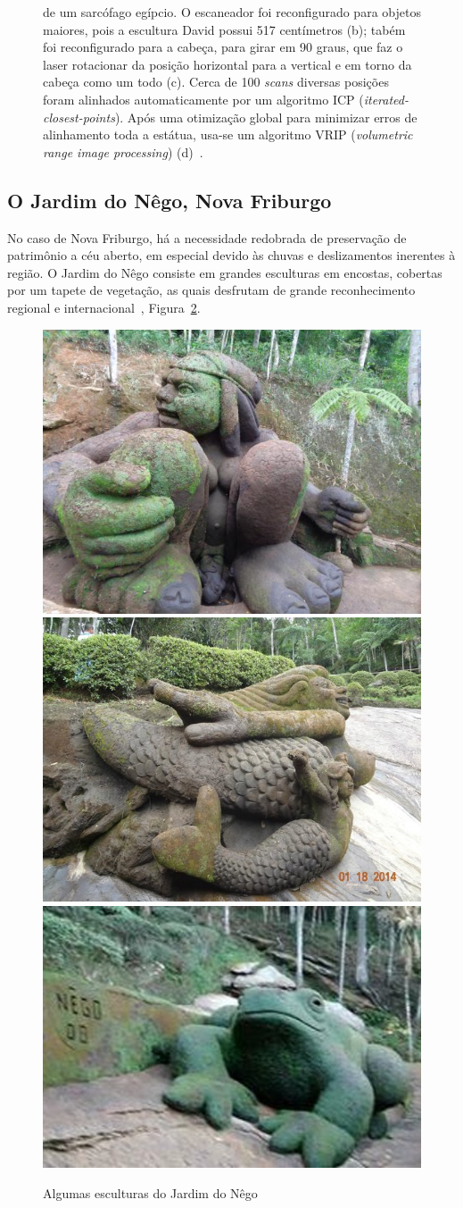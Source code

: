 \begin{figure}[!h]
{   de um sarcófago egípcio. O escaneador foi reconfigurado para objetos maiores, pois 
   a escultura David possui 517 centímetros (b); tabém foi reconfigurado para a cabeça,  
   para girar em 90 graus, que faz o laser
   rotacionar da posição horizontal para a vertical e em torno da
   cabeça como um todo (c). Cerca de 100 \emph{scans}
   diversas posições foram alinhados automaticamente por um algoritmo 
   ICP (\emph{iterated-closest-points}). Após uma otimização global para minimizar erros 
   de alinhamento toda a estátua, usa-se um algoritmo VRIP (\emph {volumetric
   range image processing}) (d)~\cite{levoy2000digital}}.
  \label{fig:david}
\end{figure}

\subsection*{O Jardim do Nêgo, Nova Friburgo}
No caso de Nova Friburgo, há a necessidade redobrada de preservação de
patrimônio a céu aberto, em especial devido às chuvas e deslizamentos inerentes à região.  O
Jardim do Nêgo consiste em grandes esculturas em encostas, cobertas por um tapete de
vegetação, as quais desfrutam de grande reconhecimento regional e internacional~\cite{JardimDoNego:TheGuardian},
Figura~\ref{fig:esculturas}.

\begin{figure} [!h]
	\centering
	\includegraphics[height=0.23\linewidth]{figs/jardim-do-nego.jpg}
	\includegraphics[height=0.23\linewidth]{figs/jardim-do-nego22.jpg}
	\includegraphics[height=0.23\linewidth]{figs/jardim-do-nego32-small.jpg}
	\caption{Algumas esculturas do Jardim do Nêgo~\cite{JardimDoNego:TheGuardian}}\label{fig:esculturas}
\end{figure}


